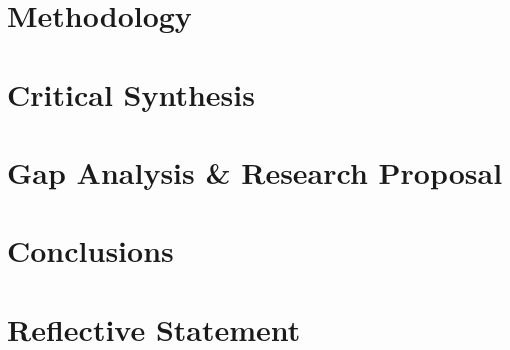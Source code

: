 \section{Methodology}

\section{Critical Synthesis}

\section{Gap Analysis \& Research Proposal}

\section{Conclusions}

\section{Reflective Statement}
\label{sec:conc}


